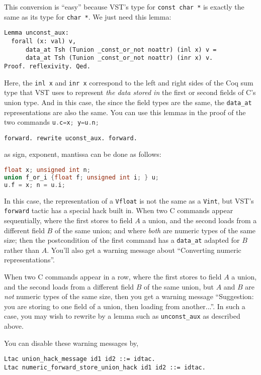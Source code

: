 \documentclass[12pt,fleqn,openany,oneside,showtrims]{memoir}
\begin{document}
This conversion is ``easy'' because VST's type for \lstinline{const char *} is exactly
the same as its type for \lstinline{char *}.  We just need this lemma:

\begin{lstlisting}
Lemma unconst_aux:
  forall (x: val) v, 
      data_at Tsh (Tunion _const_or_not noattr) (inl x) v =
      data_at Tsh (Tunion _const_or_not noattr) (inr x) v.
Proof. reflexivity. Qed.
\end{lstlisting}
Here, the \lstinline{inl x} and \lstinline{inr x} correspond to the left and
right sides of the Coq sum type that VST uses to represent
\emph{the data stored in }
the first or second fields of C's union type.  And in this case,
the since the field types are the same, the \lstinline{data_at} representations
are also the same.  You can use this lemmas in the proof of the two commands \lstinline[language=C]{u.c=x; y=u.n;}
\begin{lstlisting}
forward. rewrite uconst_aux. forward.
\end{lstlisting}

 as sign, exponent, mantissa can be done as follows:
\begin{lstlisting}[language=C]
float x; unsigned int n; 
union f_or_i {float f; unsigned int i; } u;
u.f = x; n = u.i;
\end{lstlisting}

In this case, the representation of a \lstinline{Vfloat} is not the same
as a \lstinline{Vint}, but VST's \lstinline{forward} tactic has a special hack
built in.  When two C commands appear sequentially, where the first
stores to field $A$ a union, and the second loads from a different field $B$
of the same union; and where \emph{both} are numeric types of the same size;
then the postcondition of the first command has a \lstinline{data_at}
adapted for $B$ rather than $A$.  You'll also get a warning message
about ``Converting numeric representations''.

When two C commands appear in a row, where the first
stores to field $A$ a union, and the second loads from a different field $B$
of the same union, but $A$ and $B$ are \emph{not} numeric types of the
same size, then you get a warning message ``Suggestion: you are storing to one field of a union, then loading from another...''.  In such a case, you may wish
to rewrite by a lemma such as \lstinline{unconst_aux} as described above.

You can disable these warning messages by,
\begin{lstlisting}
Ltac union_hack_message id1 id2 ::= idtac.  
Ltac numeric_forward_store_union_hack id1 id2 ::= idtac.
\end{lstlisting}
\end{document}
